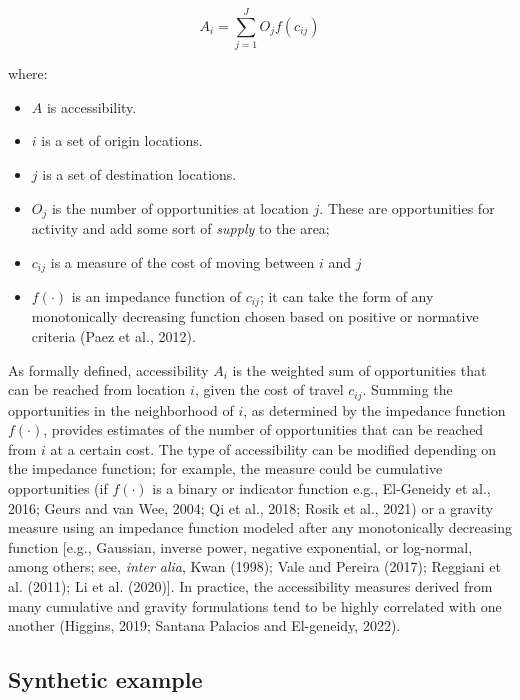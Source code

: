 \documentclass[]{elsarticle} %
\providecommand{\tightlist}{%
  \setlength{\itemsep}{0pt}\setlength{\parskip}{0pt}}
\begin{document}
\begin{equation}
\label{eq:conventional-accessibility}
A_i = \sum_{j=1}^JO_jf(c_{ij})
\end{equation}

\noindent where:

\begin{itemize}
\tightlist
\item
  \(A\) is accessibility.
\item
  \(i\) is a set of origin locations.
\item
  \(j\) is a set of destination locations.
\item
  \(O_j\) is the number of opportunities at location \(j\). These are
  opportunities for activity and add some sort of \emph{supply} to the
  area;
\item
  \(c_{ij}\) is a measure of the cost of moving between \(i\) and \(j\)
\item
  \(f(\cdot)\) is an impedance function of \(c_{ij}\); it can take the
  form of any monotonically decreasing function chosen based on positive
  or normative criteria (Paez et al., 2012).
\end{itemize}

As formally defined, accessibility \(A_i\) is the weighted sum of
opportunities that can be reached from location \(i\), given the cost of
travel \(c_{ij}\). Summing the opportunities in the neighborhood of
\(i\), as determined by the impedance function \(f(\cdot)\), provides
estimates of the number of opportunities that can be reached from \(i\)
at a certain cost. The type of accessibility can be modified depending
on the impedance function; for example, the measure could be cumulative
opportunities (if \(f(\cdot)\) is a binary or indicator function e.g.,
El-Geneidy et al., 2016; Geurs and van Wee, 2004; Qi et al., 2018; Rosik
et al., 2021) or a gravity measure using an impedance function modeled
after any monotonically decreasing function {[}e.g., Gaussian, inverse
power, negative exponential, or log-normal, among others; see,
\emph{inter alia}, Kwan (1998); Vale and Pereira (2017); Reggiani et al.
(2011); Li et al. (2020){]}. In practice, the accessibility measures
derived from many cumulative and gravity formulations tend to be highly
correlated with one another (Higgins, 2019; Santana Palacios and
El-geneidy, 2022).

\hypertarget{accessibility-numerical-example}{%
\subsection{Synthetic example}\label{accessibility-numerical-example}}
\end{document}
